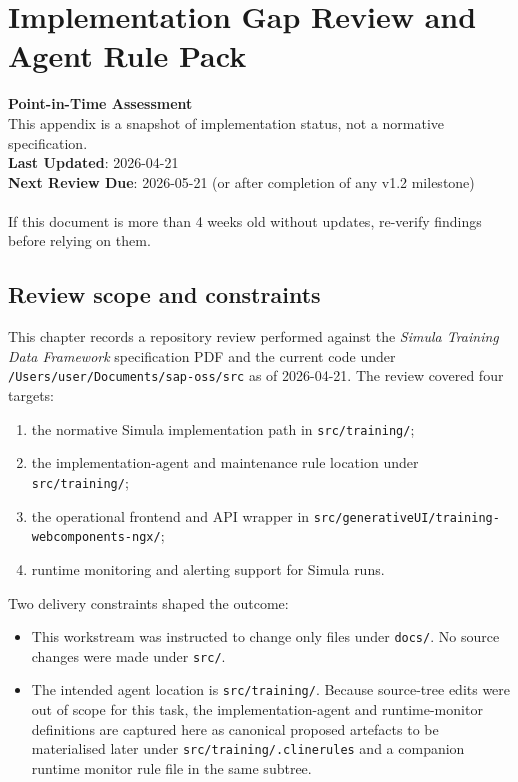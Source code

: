 \chapter{Implementation Gap Review and Agent Rule Pack}
\label{chap:simula-gap-review}

\begin{warningbox}
\textbf{Point-in-Time Assessment}\\
This appendix is a snapshot of implementation status, not a normative specification.\\
\textbf{Last Updated}: 2026-04-21\\
\textbf{Next Review Due}: 2026-05-21 (or after completion of any v1.2 milestone)\\
\\
If this document is more than 4 weeks old without updates, re-verify findings before relying on them.
\end{warningbox}

\section{Review scope and constraints}
This chapter records a repository review performed against the
\emph{Simula Training Data Framework} specification PDF and the
current code under \texttt{/Users/user/Documents/sap-oss/src} as of
2026-04-21. The review covered four targets:
\begin{enumerate}[label=\arabic*.]
  \item the normative Simula implementation path in
    \texttt{src/training/};
  \item the implementation-agent and maintenance rule location under
    \texttt{src/training/};
  \item the operational frontend and API wrapper in
    \texttt{src/generativeUI/training-webcomponents-ngx/};
  \item runtime monitoring and alerting support for Simula runs.
\end{enumerate}

Two delivery constraints shaped the outcome:
\begin{itemize}
  \item This workstream was instructed to change only files under
    \texttt{docs/}. No source changes were made under
    \texttt{src/}.
  \item The intended agent location is \texttt{src/training/}. Because
    source-tree edits were out of scope for this task, the
    implementation-agent and runtime-monitor definitions are captured
    here as canonical proposed artefacts to be materialised later
    under \texttt{src/training/.clinerules} and a companion runtime
    monitor rule file in the same subtree.
\end{itemize}

